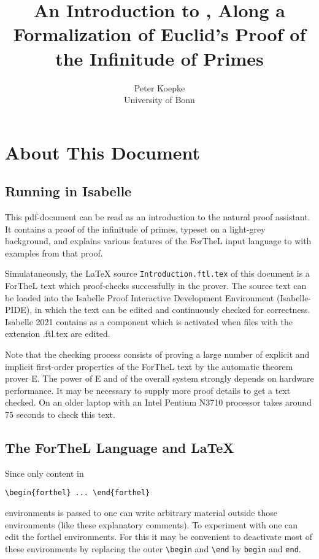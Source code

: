 \documentclass[11pt]{article}
\author{Peter Koepke\\University of Bonn}
\title{\textbf{An Introduction to \Naproche,
Along a Formalization of Euclid's Proof
of the Infinitude of Primes}}
\begin{document}
\newcommand{\val}[2]{#1_{#2}}
\newcommand{\Prod}[3]{#1_{#2} \cdots #1_{#3}}
\newcommand{\Seq}[2]{\{#1,\dots,#2\}}
\newcommand{\Set}[3]{\{#1_{#2},\dots,#1_{#3}\}}
\newcommand{\Primes}{\mathbb{P}}

\maketitle

\section{About This Document}
\subsection{Running \Naproche in Isabelle}
This pdf-document can be read as an introduction to the \Naproche natural
proof assistant. It contains a proof of the infinitude of primes, typeset on a
light-grey background, and explains various features of the ForTheL input
language to \Naproche with examples from that proof.

Simulataneously, the \LaTeX{} source \verb+Introduction.ftl.tex+ of this document
is a ForTheL text which proof-checks successfully in the \Naproche prover.
The source text can be loaded into the Isabelle Proof Interactive
Development Environment (Isabelle-PIDE), in which the text can be edited
and continuously checked for correctness. Isabelle 2021 contains \Naproche as
a component which is activated when files with the extension .ftl.tex are edited.

Note that the checking process consists of proving a large number of explicit
and implicit first-order properties of the ForTheL text by the automatic
theorem prover E. The power of E and of the overall \Naproche system
strongly depends on hardware performance. It may be necessary to supply
more proof details to get a text checked. On an older laptop
with an Intel Pentium N3710 processor \Naproche takes
around 75 seconds to check this text.

\subsection{The ForTheL Language and \LaTeX}
Since only content in

\verb_\_\verb_begin{forthel} ... _\verb_\_\verb_end{forthel}_

\noindent environments is passed to \Naproche one can write arbitrary material
outside those environments (like these explanatory comments). To experiment with
\Naproche one can edit the forthel environments. For this it may be convenient to
deactivate most of these environments by replacing the outer
\verb_\_\verb_begin_ and \verb_\_\verb_end_ by
\verb_begin_ and \verb_end_.
\end{document}
